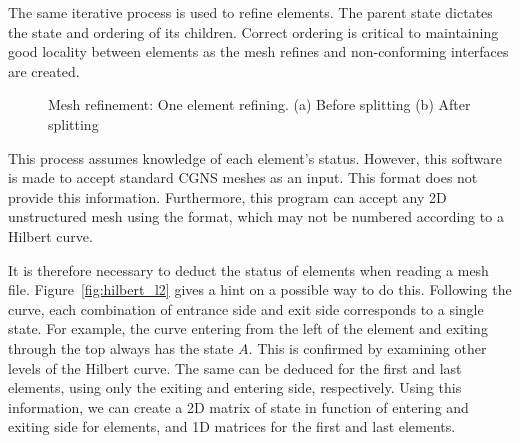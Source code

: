 The same iterative process is used to refine elements. The parent state dictates the state and
ordering of its children. Correct ordering is critical to maintaining good locality between elements
as the mesh refines and non-conforming interfaces are created.

\begin{figure}[H]
	\centering
	\hfill
	\caption{Mesh refinement: One element refining. (a) Before splitting (b) After splitting}
	\label{fig:hilbert_refining}
\end{figure}

This process assumes knowledge of each element's status. However, this software is made to accept
standard CGNS meshes as an input. This format does not provide this information. Furthermore, this
program can accept any 2D unstructured mesh using the format, which may not be numbered according to
a Hilbert curve. 

It is therefore necessary to deduct the status of elements when reading a mesh file.
Figure~\ref{fig:hilbert_l2} gives a hint on a possible way to do this. Following the curve, each
combination of entrance side and exit side corresponds to a single state. For example, the curve
entering from the left of the element and exiting through the top always has the state $A$. This is
confirmed by examining other levels of the Hilbert curve. The same can be deduced for the first and
last elements, using only the exiting and entering side, respectively. Using this information, we
can create a 2D matrix of state in function of entering and exiting side for elements, and 1D
matrices for the first and last elements.

